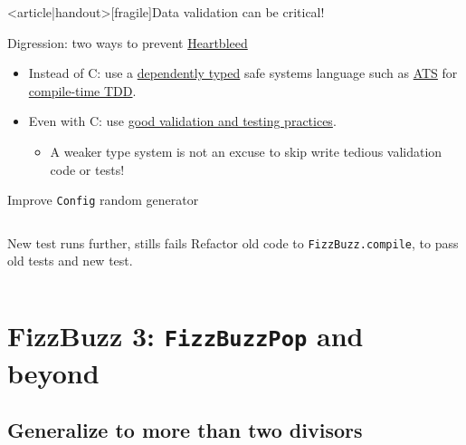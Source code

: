 \begin{frame}<article|handout>[fragile]{Data validation can be critical!}
  \begin{block}{Digression: two ways to prevent \href{http://heartbleed.com/}{Heartbleed}}
    \begin{itemize}
    \item Instead of C: use a \href{http://en.wikipedia.org/wiki/Dependent_type}{dependently typed} safe systems language such as \href{http://www.ats-lang.org/}{ATS} for \href{http://bluishcoder.co.nz/2014/04/11/preventing-heartbleed-bugs-with-safe-languages.html}{compile-time TDD}.
    \item Even with C: use \href{http://martinfowler.com/articles/testing-culture.html}{good validation and testing practices}.
      \begin{itemize}
      \item A weaker type system is not an \alert{excuse} to skip
        write tedious validation code or tests!
      \end{itemize}
    \end{itemize}
  \end{block}
\end{frame}

\begin{frame}[fragile]{Improve \texttt{Config} random generator}
  \inputminted[gobble=2]{scala}{FizzBuzzSpec7.scala}
\end{frame}

\begin{frame}[fragile]{New test runs further, stills fails}
  Refactor old code to \texttt{FizzBuzz.compile}, to pass old tests and new test.

  \inputminted{scala}{FizzBuzz3Compile.scala}
\end{frame}

\section{FizzBuzz 3: \texttt{FizzBuzzPop} and beyond}

\subsection{Generalize to more than two divisors}

